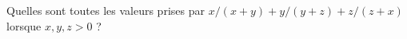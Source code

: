Quelles sont toutes les valeurs prises par $x/(x + y) + y/(y + z) + z/(z + x)$ lorsque $x, y, z > 0$ ?
